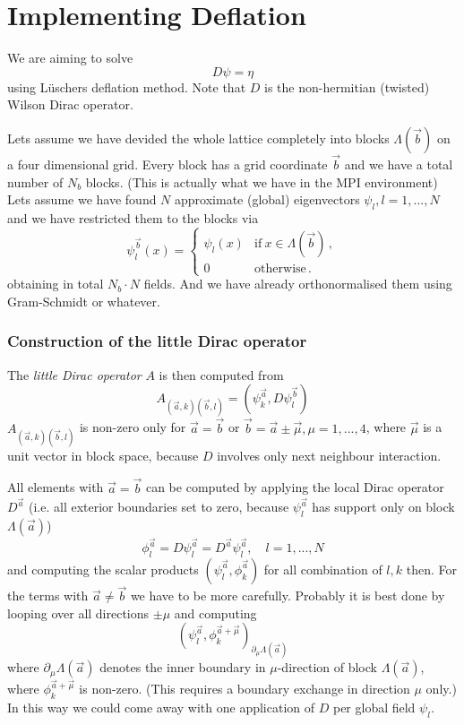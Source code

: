 \section{Implementing Deflation}

We are aiming to solve 
\[
D\psi = \eta
\]
using L{\"u}schers deflation method. Note that $D$ is the
non-hermitian (twisted) Wilson Dirac operator.

Lets assume we have devided the whole lattice completely into blocks
$\Lambda(\vec b)$ on a four dimensional grid. Every block has a grid
coordinate $\vec b$ and we have a total number of $N_b$ blocks. (This
is actually what we have in the MPI environment) Lets
assume we have found $N$ approximate (global) eigenvectors $\psi_l,
l=1,...,N$ and we have restricted them to the blocks via
\[
\psi_l^{\vec b}(x) =
\begin{cases}
  \psi_l(x) & \textrm{if}\ x \in \Lambda(\vec b)\, ,\\
  0 & \textrm{otherwise}\,.
\end{cases}
\]
obtaining in total $N_b\cdot N$ fields. And we have already
orthonormalised them using Gram-Schmidt or whatever.

\subsubsection*{Construction of the little Dirac operator}

The \emph{little Dirac operator} $A$ is then computed from
\[
A_{(\vec a,k)(\vec b, l)} = (\psi_k^{\vec a},D\psi_l^{\vec b})
\]
$A_{(\vec a,k)(\vec b, l)}$ is non-zero only for $\vec a = \vec b$ or
$\vec b = \vec a \pm \vec \mu, \mu=1,...,4$, where $\vec\mu$ is a unit
vector in block space, because $D$ involves only next neighbour
interaction. 

All elements with $\vec a = \vec b$ can be computed by applying the
local Dirac operator $D^{\vec a}$ (i.e. all exterior boundaries set to
zero, because $\psi_l^{\vec a}$ has support only on block
$\Lambda(\vec a)$)
\[
\phi_l^{\vec a} = D \psi_l^{\vec a} = D^{\vec a} \psi_l^{\vec a},\quad
l=1,...,N 
\]
and computing the scalar products $(\psi_l^{\vec a},\phi_k^{\vec a})$
for all combination of $l,k$ then. For the terms with $\vec a
\neq \vec b$ we have to be more carefully. Probably it is best done by
looping over all directions $\pm\mu$ and computing
\[
(\psi_l^{\vec a},\phi_k^{\vec a+\vec\mu})_{\partial_{\mu}\Lambda(\vec a)}
\]
where $\partial_{\mu}\Lambda(\vec a)$ denotes the inner boundary in
$\mu$-direction of block $\Lambda(\vec a)$, where $\phi_k^{\vec
  a+\vec\mu}$ is non-zero. (This requires a boundary exchange in
direction $\mu$ only.) In this way we could come away with one
application of $D$ per global field $\psi_l$.

